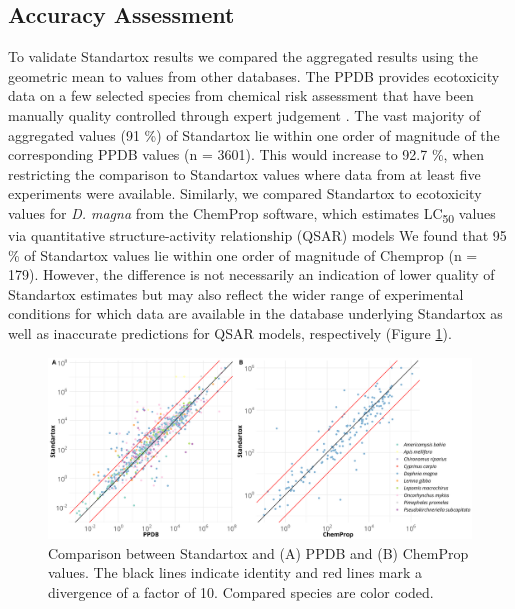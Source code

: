\subsection{Accuracy Assessment}
To validate Standartox results we compared the aggregated results using the geometric mean to values from other databases. The PPDB provides ecotoxicity data on a few selected species from chemical risk assessment that have been manually quality controlled through expert judgement \citep{lewis_international_2016}. The vast majority of aggregated values (91 \%) of Standartox lie within one order of magnitude of the corresponding PPDB values (n = 3601). This would increase to 92.7 \%, when restricting the comparison to Standartox values where data from at least five experiments were available. Similarly, we compared Standartox to ecotoxicity values for \textit{D. magna} from the ChemProp \citep{ufzdepartmentofecologicalchemistry_chemprop_2019} software, which estimates LC\textsubscript{50} values via quantitative structure-activity relationship (QSAR) models \citep{schuurmann_quantitative_2011} We found that  95 \% of Standartox values lie within one order of magnitude of Chemprop (n = 179). However, the diﬀerence is not necessarily an indication of lower quality of Standartox estimates but may also reflect the wider range of experimental conditions for which data are available in the database underlying Standartox as well as inaccurate predictions for QSAR models, respectively (Figure \ref{fig:standartox_ppdb_diff}).

\begin{figure}[h!]
    \includegraphics[width=1\linewidth]{article/figures/gg_ppdb_stan_compare_continous.png}
    \caption{Comparison between Standartox and (A) PPDB and (B) ChemProp values. The black lines indicate identity and red lines mark a divergence of a factor of 10. Compared species are color coded.}
    \label{fig:standartox_ppdb_diff}
\end{figure}

